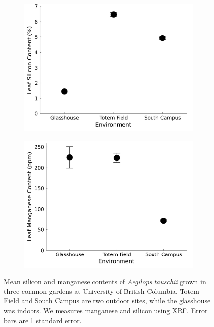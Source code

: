 \documentclass[12pt, letterpaper]{report}
\begin{document}
\begin{figure}[ht]
        \centering
        \begin{subfigure}[b]{0.7\textwidth}
                \centering
                \includegraphics[width = \textwidth]{images/sienvplot.png}
        \end{subfigure}



        \begin{subfigure}[b]{0.70\textwidth}
                \centering
                \includegraphics[width = \textwidth]{images/mnenvplot.png}
        \end{subfigure}
                
        \centering
        \caption{Mean silicon and manganese contents of \textit{Aegilops tauschii} grown in three common gardens at University of British Columbia. Totem Field and South Campus are two outdoor sites, while the glasshouse was indoors. We measures manganese and silicon using XRF. Error bars are 1 standard error.}
        \label{Fig:environment_elements}
\end{figure}
\end{document}

